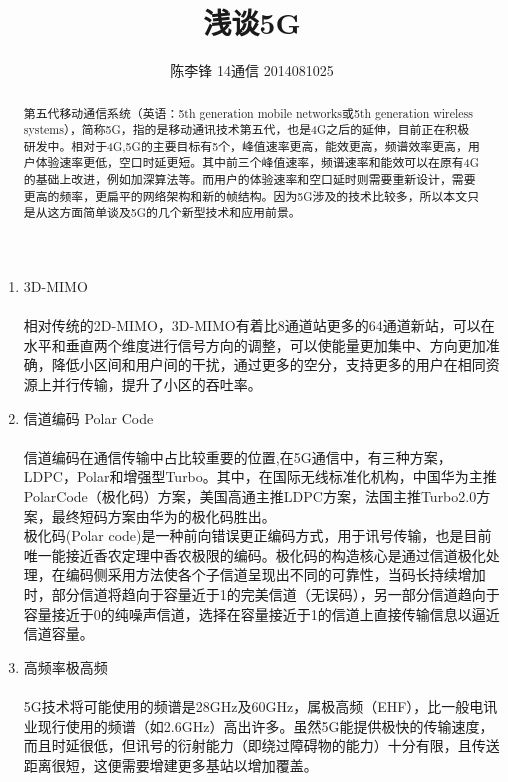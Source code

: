 \documentclass[a4paper,10pt]{ctexart}
\title{\centering \LARGE{浅谈5G}\\%
} %
\author{\textsc {陈李锋 14通信 2014081025 } %
} %
\begin{document}
\maketitle %

\begin{abstract}
第五代移动通信系统（英语：5th generation mobile networks或5th generation wireless systems），简称5G，指的是移动通讯技术第五代，也是4G之后的延伸，目前正在积极研发中。相对于4G,5G的主要目标有5个，峰值速率更高，能效更高，频谱效率更高，用户体验速率更低，空口时延更短。其中前三个峰值速率，频谱速率和能效可以在原有4G的基础上改进，例如加深算法等。而用户的体验速率和空口延时则需要重新设计，需要更高的频率，更扁平的网络架构和新的帧结构。因为5G涉及的技术比较多，所以本文只是从这方面简单谈及5G的几个新型技术和应用前景。
\end{abstract}

\subsubsection*{}
\begin{enumerate}
\item 3D-MIMO
\paragraph{} 
相对传统的2D-MIMO，3D-MIMO有着比8通道站更多的64通道新站，可以在水平和垂直两个维度进行信号方向的调整，可以使能量更加集中、方向更加准确，降低小区间和用户间的干扰，通过更多的空分，支持更多的用户在相同资源上并行传输，提升了小区的吞吐率。
\item 信道编码 Polar Code
\paragraph{}
 信道编码在通信传输中占比较重要的位置,在5G通信中，有三种方案，LDPC，Polar和增强型Turbo。其中，在国际无线标准化机构，中国华为主推PolarCode（极化码）方案，美国高通主推LDPC方案，法国主推Turbo2.0方案，最终短码方案由华为的极化码胜出。\\
极化码(Polar code)是一种前向错误更正编码方式，用于讯号传输，也是目前唯一能接近香农定理中香农极限的编码。极化码的构造核心是通过信道极化处理，在编码侧采用方法使各个子信道呈现出不同的可靠性，当码长持续增加时，部分信道将趋向于容量近于1的完美信道（无误码），另一部分信道趋向于容量接近于0的纯噪声信道，选择在容量接近于1的信道上直接传输信息以逼近信道容量。
\item 高频率极高频
\paragraph{}
5G技术将可能使用的频谱是28GHz及60GHz，属极高频（EHF），比一般电讯业现行使用的频谱（如2.6GHz）高出许多。虽然5G能提供极快的传输速度，而且时延很低，但讯号的衍射能力（即绕过障碍物的能力）十分有限，且传送距离很短，这便需要增建更多基站以增加覆盖。
\end{enumerate}
\end{document}
